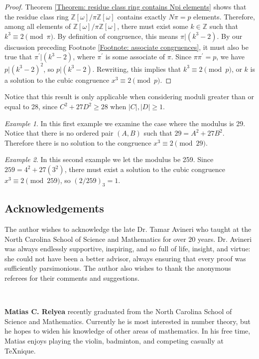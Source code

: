\documentclass[10pt]{amsart}
\newcommand{\ZZ}{\mathbb{Z}}
\theoremstyle{plain}
\theoremstyle{definition}
\theoremstyle{remark}
\newtheorem{ex}{Example}
\numberwithin{equation}{section}
\begin{document}
\begin{proof}
    \indent Theorem \ref{Theorem: residue class ring contains Npi elements} shows that the residue class ring $\ZZ[\omega]/\pi\ZZ[\omega]$ contains exactly $N\pi=p$ elements. Therefore, among all elements of $\ZZ[\omega]/\pi\ZZ[\omega]$, there must exist some $k\in\ZZ$ such that $k^{3}\equiv 2\pmod{\pi}$. By definition of congruence, this means $\pi|(k^{3}-2)$. By our discussion preceding Footnote \ref{Footnote: associate congruences}, it must also be true that $\pi^{\prime}|(k^{3}-2)$, where $\pi^{\prime}$ is some associate of $\pi$. Since $\pi\pi^{\prime}=p$, we have $p|(k^{3}-2)^{2}$, so $p|(k^{3}-2)$. Rewriting, this implies that $k^{3}\equiv 2\pmod{p}$, or $k$ is a solution to the cubic congruence $x^{3}\equiv 2\pmod{p}$. 
\end{proof}

Notice that this result is only applicable when considering moduli greater than or equal to 28, since $C^{2}+27D^{2}\geq 28$ when $|C|,|D|\geq 1$.  
\begin{ex}
    In this first example we examine the case where the modulus is 29. Notice that there is no ordered pair $(A,B)$ such that $29=A^{2}+27B^{2}$. Therefore there is no solution to the congruence $x^{3}\equiv 2\pmod{29}$. 
\end{ex}
\begin{ex}
    In this second example we let the modulus be 259. Since $259=4^{2}+27(3^{2})$, there must exist a solution to the cubic congruence $x^{3}\equiv 2\pmod{259}$, so $(2/259)_{3}=1$. 
\end{ex}


\subsection*{Acknowledgements} The author wishes to acknowledge the late Dr. Tamar Avineri who taught at the North Carolina School of Science and Mathematics for over $20$ years. Dr. Avineri was always endlessly supportive, inspiring, and so full of life, insight, and virtue: she could not have been a better advisor, always ensuring that every proof was sufficiently parsimonious. The author also wishes to thank the anonymous referees for their comments and suggestions.



\

\noindent \textbf{Matias C. Relyea} recently graduated from the North Carolina School of Science and Mathematics. Currently he is most interested in number theory, but he hopes to widen his knowledge of other areas of mathematics. In his free time, Matias enjoys playing the violin, badminton, and competing casually at TeXnique.
\end{document}
